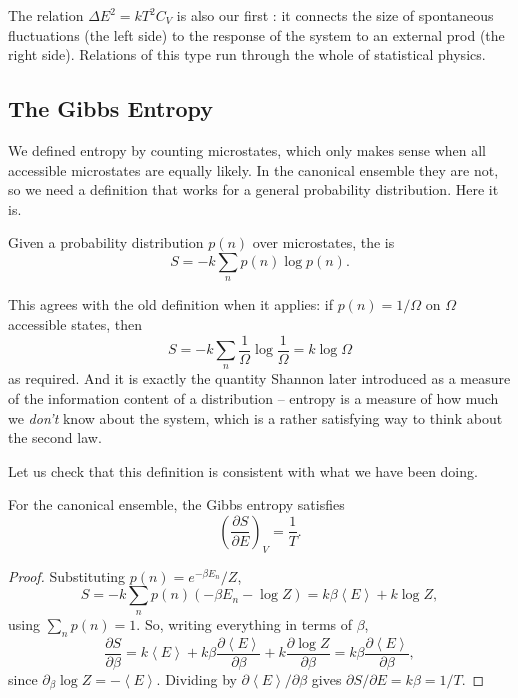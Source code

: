 \documentclass[a4paper]{scrartcl}
\newcommand{\avg}[1]{\left\langle #1 \right\rangle}
\begin{document}
The relation $\Delta E^2 = kT^2 C_V$ is also our first : it connects the size of spontaneous fluctuations (the left side) to the response of the system to an external prod (the right side). Relations of this type run through the whole of statistical physics.

\subsection{The Gibbs Entropy}

We defined entropy by counting microstates, which only makes sense when all accessible microstates are equally likely. In the canonical ensemble they are not, so we need a definition that works for a general probability distribution. Here it is.

\begin{definition}
	Given a probability distribution $p(n)$ over microstates, the  is
	$$
	S = -k \sum_n p(n) \log p(n).
	$$
\end{definition}

This agrees with the old definition when it applies: if $p(n) = 1/\Omega$ on $\Omega$ accessible states, then
$$
S = -k\sum_{n} \frac{1}{\Omega}\log\frac 1\Omega = k\log\Omega
$$
as required. And it is exactly the quantity Shannon later introduced as a measure of the information content of a distribution -- entropy is a measure of how much we \emph{don't} know about the system, which is a rather satisfying way to think about the second law.

Let us check that this definition is consistent with what we have been doing.

\begin{proposition}
	For the canonical ensemble, the Gibbs entropy satisfies
	$$
	\left(\frac{\partial S}{\partial E}\right)_V = \frac 1T.
	$$
\end{proposition}
\begin{proof}
	Substituting $p(n) = e^{-\beta E_n}/Z$,
	$$
	S = -k\sum_n p(n)\left(-\beta E_n - \log Z\right) = k\beta \avg E + k \log Z,
	$$
	using $\sum_n p(n) = 1$. So, writing everything in terms of $\beta$,
	$$
	\frac{\partial S}{\partial \beta} = k \avg E + k\beta \frac{\partial \avg E}{\partial \beta} + k \frac{\partial \log Z}{\partial\beta} = k\beta \frac{\partial \avg E}{\partial\beta},
	$$
	since $\partial_\beta \log Z = -\avg E$. Dividing by $\partial \avg E/\partial\beta$ gives $\partial S/\partial E = k\beta = 1/T$.
\end{proof}
\end{document}
